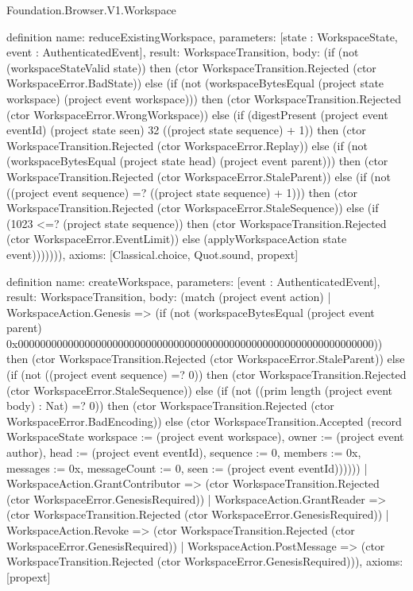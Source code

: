\begin{lexlean}{Foundation.Browser.V1.Workspace}
\begin{semanticmodule}
definition{
  name: reduceExistingWorkspace,
  parameters: [state : WorkspaceState, event : AuthenticatedEvent],
  result: WorkspaceTransition,
  body: (if (not (workspaceStateValid state)) then (ctor WorkspaceTransition.Rejected (ctor WorkspaceError.BadState)) else (if (not (workspaceBytesEqual (project state workspace) (project event workspace))) then (ctor WorkspaceTransition.Rejected (ctor WorkspaceError.WrongWorkspace)) else (if (digestPresent (project event eventId) (project state seen) 32 ((project state sequence) + 1)) then (ctor WorkspaceTransition.Rejected (ctor WorkspaceError.Replay)) else (if (not (workspaceBytesEqual (project state head) (project event parent))) then (ctor WorkspaceTransition.Rejected (ctor WorkspaceError.StaleParent)) else (if (not ((project event sequence) =? ((project state sequence) + 1))) then (ctor WorkspaceTransition.Rejected (ctor WorkspaceError.StaleSequence)) else (if (1023 <=? (project state sequence)) then (ctor WorkspaceTransition.Rejected (ctor WorkspaceError.EventLimit)) else (applyWorkspaceAction state event))))))),
  axioms: [Classical.choice, Quot.sound, propext]
}

definition{
  name: createWorkspace,
  parameters: [event : AuthenticatedEvent],
  result: WorkspaceTransition,
  body: (match (project event action)
    | WorkspaceAction.Genesis => (if (not (workspaceBytesEqual (project event parent) 0x0000000000000000000000000000000000000000000000000000000000000000)) then (ctor WorkspaceTransition.Rejected (ctor WorkspaceError.StaleParent)) else (if (not ((project event sequence) =? 0)) then (ctor WorkspaceTransition.Rejected (ctor WorkspaceError.StaleSequence)) else (if (not ((prim length (project event body) : Nat) =? 0)) then (ctor WorkspaceTransition.Rejected (ctor WorkspaceError.BadEncoding)) else (ctor WorkspaceTransition.Accepted (record WorkspaceState {workspace := (project event workspace), owner := (project event author), head := (project event eventId), sequence := 0, members := 0x, messages := 0x, messageCount := 0, seen := (project event eventId)})))))
    | WorkspaceAction.GrantContributor => (ctor WorkspaceTransition.Rejected (ctor WorkspaceError.GenesisRequired))
    | WorkspaceAction.GrantReader => (ctor WorkspaceTransition.Rejected (ctor WorkspaceError.GenesisRequired))
    | WorkspaceAction.Revoke => (ctor WorkspaceTransition.Rejected (ctor WorkspaceError.GenesisRequired))
    | WorkspaceAction.PostMessage => (ctor WorkspaceTransition.Rejected (ctor WorkspaceError.GenesisRequired))),
  axioms: [propext]
}


\end{semanticmodule}
\end{lexlean}
